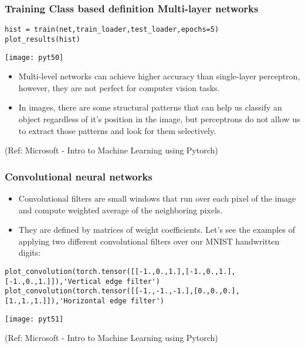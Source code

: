 \begin{frame}[fragile] \frametitle{Training Class based definition Multi-layer networks}
\begin{lstlisting}
hist = train(net,train_loader,test_loader,epochs=5)
plot_results(hist)
\end{lstlisting}

\begin{center}
\texttt{[image: pyt50]}
\end{center}


\begin{itemize}
\item Multi-level networks can achieve higher accuracy than single-layer perceptron, however, they are not perfect for computer vision tasks. 
\item In images, there are some structural patterns that can help us classify an object regardless of it's position in the image, but perceptrons do not allow us to extract those patterns and look for them selectively.
\end{itemize}

\tiny{(Ref: Microsoft - Intro to Machine Learning using Pytorch)}
\end{frame}

\begin{frame}[fragile] \frametitle{Convolutional neural networks}

\begin{itemize}
\item Convolutional filters are small windows that run over each pixel of the image and compute weighted average of the neighboring pixels.

\item They are defined by matrices of weight coefficients. Let's see the examples of applying two different convolutional filters over our MNIST handwritten digits:
\end{itemize}


\begin{lstlisting}
plot_convolution(torch.tensor([[-1.,0.,1.],[-1.,0.,1.],[-1.,0.,1.]]),'Vertical edge filter')
plot_convolution(torch.tensor([[-1.,-1.,-1.],[0.,0.,0.],[1.,1.,1.]]),'Horizontal edge filter')

\end{lstlisting}

\begin{center}
\texttt{[image: pyt51]}
\end{center}

\tiny{(Ref: Microsoft - Intro to Machine Learning using Pytorch)}
\end{frame}

